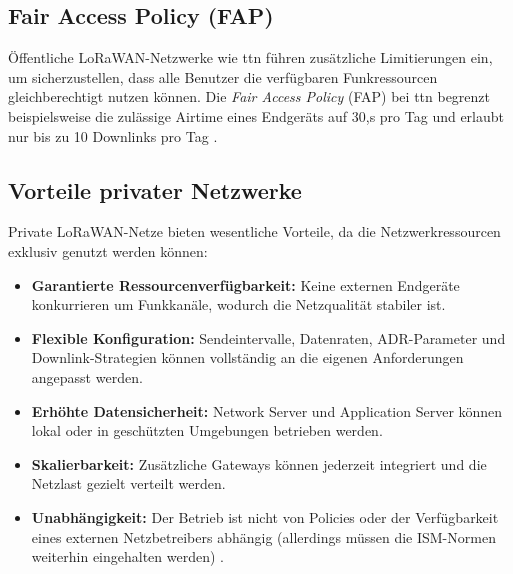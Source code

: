 \subsection{Fair Access Policy (FAP)}

Öffentliche LoRaWAN-Netzwerke wie \ac{ttn} führen zusätzliche Limitierungen ein, um sicherzustellen, dass alle Benutzer die verfügbaren Funkressourcen gleichberechtigt nutzen können. Die \emph{Fair Access Policy} (FAP) bei \ac{ttn} begrenzt beispielsweise die zulässige Airtime eines Endgeräts auf 30,s pro Tag und erlaubt nur bis zu 10 Downlinks pro Tag \cite{TTN:2021b}.

\subsection{Vorteile privater Netzwerke}

Private LoRaWAN-Netze bieten wesentliche Vorteile, da die Netzwerkressourcen exklusiv genutzt werden können:
\begin{itemize}
	\item \textbf{Garantierte Ressourcenverfügbarkeit:} Keine externen Endgeräte konkurrieren um Funkkanäle, wodurch die Netzqualität stabiler ist.
	\item \textbf{Flexible Konfiguration:} Sendeintervalle, Datenraten, ADR-Parameter und Downlink-Strategien können vollständig an die eigenen Anforderungen angepasst werden.
	\item \textbf{Erhöhte Datensicherheit:} Network Server und Application Server können lokal oder in geschützten Umgebungen betrieben werden.
	\item \textbf{Skalierbarkeit:} Zusätzliche Gateways können jederzeit integriert und die Netzlast gezielt verteilt werden.
	\item \textbf{Unabhängigkeit:} Der Betrieb ist nicht von Policies oder der Verfügbarkeit eines externen Netzbetreibers abhängig (allerdings müssen die ISM-Normen weiterhin eingehalten werden) \cite{Montagny:2022}.
\end{itemize}



